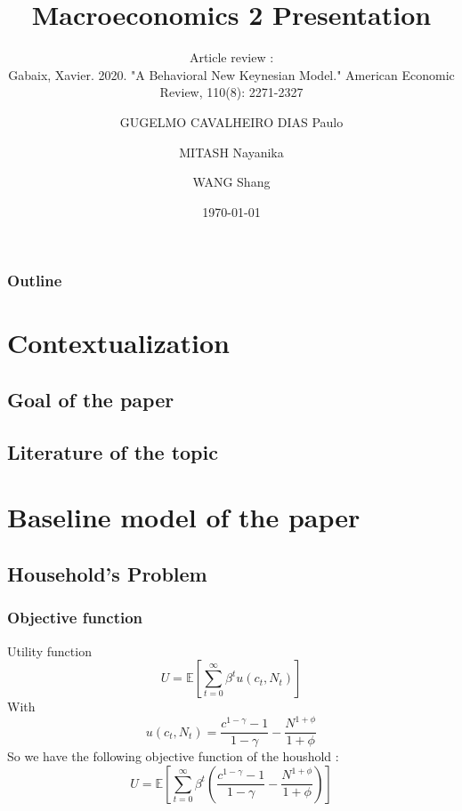 \documentclass{beamer}
\title{Macroeconomics 2 Presentation}
\subtitle{Article review :\\ Gabaix, Xavier. 2020. "A Behavioral New Keynesian Model." American Economic Review, 110(8): 2271-2327}
\author{GUGELMO CAVALHEIRO DIAS Paulo \\ \and MITASH Nayanika \\ \and WANG Shang}
\institute{Sciences Po}
\date{\today}
\begin{document}
\begin{frame}
    \titlepage
\end{frame}

\begin{frame}
    \frametitle{Outline}
    \tableofcontents[hideallsubsections]
\end{frame}

\section{Contextualization}
\begin{frame}
\end{frame}

\subsection{Goal of the paper}
\subsection{Literature of the topic}

\section{Baseline model of the paper}
\begin{frame}
\end{frame}

\subsection{Household's Problem}

\subsubsection{Objective function}
\begin{frame}{Utility function}
    \begin{equation}
        \label{3}
        U = \mathbb{E}\left[\sum_{t=0}^{\infty}\beta^{t}u(c_t,N_t)\right]
    \end{equation}
    With
    \begin{equation*}
    u(c_t,N_t) = \frac{c^{1-\gamma}-1}{1-\gamma}-\frac{N^{1+\phi}}{1+\phi}
    \end{equation*}
    So we have the following objective function of the houshold : 
    \begin{equation*}
        U = \mathbb{E}\left[\sum_{t=0}^{\infty}\beta^{t}\left(\frac{c^{1-\gamma}-1}{1-\gamma}-\frac{N^{1+\phi}}{1+\phi}\right)\right]
    \end{equation*}
\end{frame}
\end{document}
